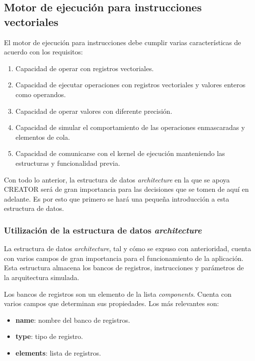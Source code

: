 \subsection{Motor de ejecución para instrucciones vectoriales}\label{sec:motor}

El motor de ejecución para instrucciones debe cumplir varias características de acuerdo con los requisitos:

\begin{enumerate}
\item Capacidad de operar con registros vectoriales.
\item Capacidad de ejecutar operaciones con registros vectoriales y valores enteros como operandos.
\item Capacidad de operar valores con diferente precisión.
\item Capacidad de simular el comportamiento de las operaciones enmascaradas y elementos de cola.
\item Capacidad de comunicarse con el kernel de ejecución manteniendo las estructuras y funcionalidad previa.
\end{enumerate}

Con todo lo anterior, la estructura de datos \textit{architecture} en la que se apoya CREATOR será de gran importancia para las decisiones que se tomen de aquí en adelante. Es por esto que primero se hará una pequeña introducción a esta estructura de datos.

\subsubsection{Utilización de la estructura de datos \textit{architecture}}

La estructura de datos \textit{architecture}, tal y cómo se expuso con
anterioridad, cuenta con varios campos de gran importancia para el
funcionamiento de la aplicación. Esta estructura almacena los bancos de
registros, instrucciones y parámetros de la arquitectura simulada.

Los bancos de registros son un elemento de la lista \textit{components}. Cuenta con varios campos que determinan sus propiedades. Los más relevantes son:
\begin{itemize}
\item \textbf{name}: nombre del banco de registros.
\item \textbf{type}: tipo de registro.
\item \textbf{elements}: lista de registros.
\end{itemize}

